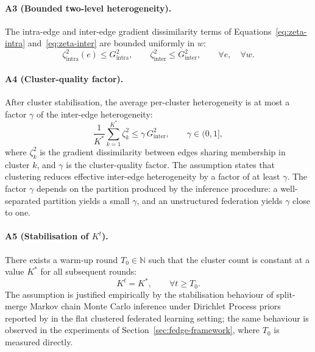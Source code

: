 \paragraph{A3 (Bounded two-level heterogeneity).}
The intra-edge and inter-edge gradient dissimilarity terms of Equations~\eqref{eq:zeta-intra} and~\eqref{eq:zeta-inter} are bounded uniformly in $w$:
\begin{equation}
\label{eq:asm-het}
\zeta_{\text{intra}}^{2}(e) \leq G_{\text{intra}}^{2}, \qquad \zeta_{\text{inter}}^{2} \leq G_{\text{inter}}^{2}, \qquad \forall e, \quad \forall w.
\end{equation}

\paragraph{A4 (Cluster-quality factor).}
After cluster stabilisation, the average per-cluster heterogeneity is at most a factor $\gamma$ of the inter-edge heterogeneity:
\begin{equation}
\label{eq:asm-gamma}
\frac{1}{K^{*}} \sum_{k=1}^{K^{*}} \zeta_{k}^{2} \leq \gamma \, G_{\text{inter}}^{2}, \qquad \gamma \in (0, 1],
\end{equation}
where $\zeta_{k}^{2}$ is the gradient dissimilarity between edges sharing membership in cluster $k$, and $\gamma$ is the cluster-quality factor. The assumption states that clustering reduces effective inter-edge heterogeneity by a factor of at least $\gamma$. The factor $\gamma$ depends on the partition produced by the inference procedure: a well-separated partition yields a small $\gamma$, and an unstructured federation yields $\gamma$ close to one.

\paragraph{A5 (Stabilisation of $K^t$).}
There exists a warm-up round $T_{0} \in \mathbb{N}$ such that the cluster count is constant at a value $K^{*}$ for all subsequent rounds:
\begin{equation}
\label{eq:asm-stab}
K^{t} = K^{*}, \qquad \forall t \geq T_{0}.
\end{equation}
The assumption is justified empirically by the stabilisation behaviour of split-merge Markov chain Monte Carlo inference under Dirichlet Process priors reported by \cite{jaramillo2026dpmmcfl} in the flat clustered federated learning setting; the same behaviour is observed in the experiments of Section~\ref{sec:fedge-framework}, where $T_{0}$ is measured directly.

